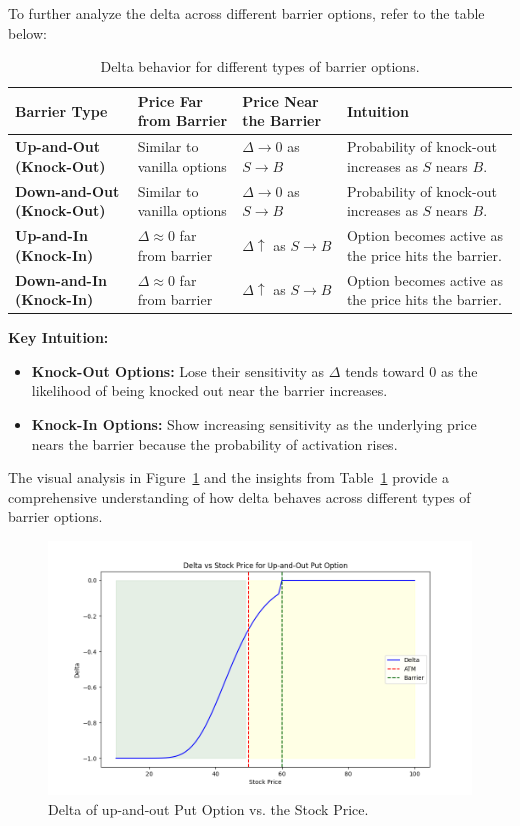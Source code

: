 To further analyze the delta across different barrier options, refer to the table below:


\begin{center}
	\begin{table}[H]
		\begin{tabular}{ | m{4em} | m{1.4cm}| m{1.4cm} | m{1.4cm}|} 
			\hline
			\textbf{Barrier Type}         & \textbf{Price Far from Barrier} & \textbf{Price Near the Barrier} & \textbf{Intuition}  \\
			\hline
			\textbf{Up-and-Out (Knock-Out)} & Similar to vanilla options     & $\Delta \to 0$ as $S \to B$  & Probability of knock-out increases as $S$ nears $B$. \\ 
			\textbf{Down-and-Out (Knock-Out)} & Similar to vanilla options     & $\Delta \to 0$ as $S \to B$  & Probability of knock-out increases as $S$ nears $B$. \\ 
			\hline
			\textbf{Up-and-In (Knock-In)}    & $\Delta \approx 0$ far from barrier   & $\Delta \uparrow$ as $S \to B$  & Option becomes active as the price hits the barrier. \\ 
			\hline
			\textbf{Down-and-In (Knock-In)}  & $\Delta \approx 0$ far from barrier   & $\Delta \uparrow$ as $S \to B$  & Option becomes active as the price hits the barrier. \\ 
			\hline
		\end{tabular}
		\caption{Delta behavior for different types of barrier options.}
		\label{tab:delta_barrier_options}
	\end{table}
\end{center}

\textbf{Key Intuition:}
\begin{itemize}
    \item \textbf{Knock-Out Options:} Lose their sensitivity as $\Delta$ tends toward $0$ as the likelihood of being knocked out near the barrier increases.
    \item \textbf{Knock-In Options:} Show increasing sensitivity as the underlying price nears the barrier because the probability of activation rises.
\end{itemize}

The visual analysis in Figure~\ref{fig:delta_upout} and the insights from Table~\ref{tab:delta_barrier_options} provide a comprehensive understanding of how delta behaves across different types of barrier options.
\begin{figure}[h]
    \centering
    \includegraphics[width=.65\linewidth]{content/images/delta.png}
    \caption{Delta of up-and-out Put Option vs. the Stock Price.}
    \label{fig:delta_upout}
\end{figure}

